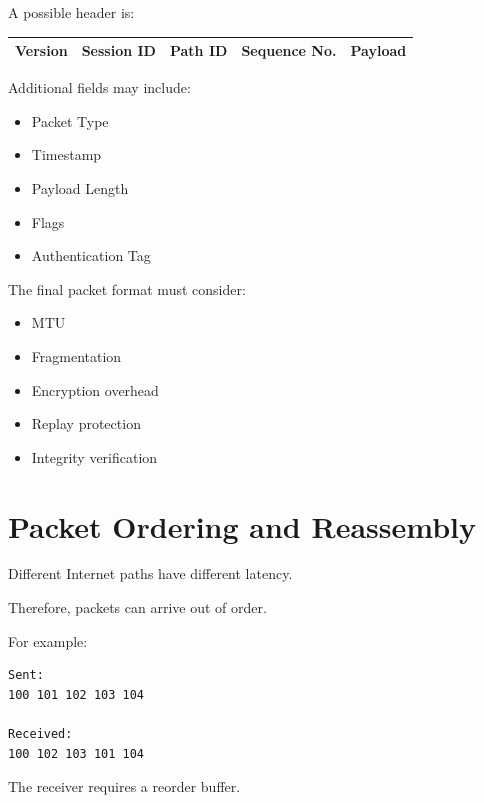 \documentclass[12pt,a4paper]{article}
\begin{document}
A possible header is:

\begin{center}
\begin{tabular}{|c|c|c|c|c|}
\hline
Version & Session ID & Path ID & Sequence No. & Payload \\
\hline
\end{tabular}
\end{center}

Additional fields may include:

\begin{itemize}
    \item Packet Type
    \item Timestamp
    \item Payload Length
    \item Flags
    \item Authentication Tag
\end{itemize}

The final packet format must consider:

\begin{itemize}
    \item MTU
    \item Fragmentation
    \item Encryption overhead
    \item Replay protection
    \item Integrity verification
\end{itemize}


\section{Packet Ordering and Reassembly}

Different Internet paths have different latency.

Therefore, packets can arrive out of order.

For example:

\begin{verbatim}
Sent:
100 101 102 103 104

Received:
100 102 103 101 104
\end{verbatim}

The receiver requires a reorder buffer.
\end{document}
